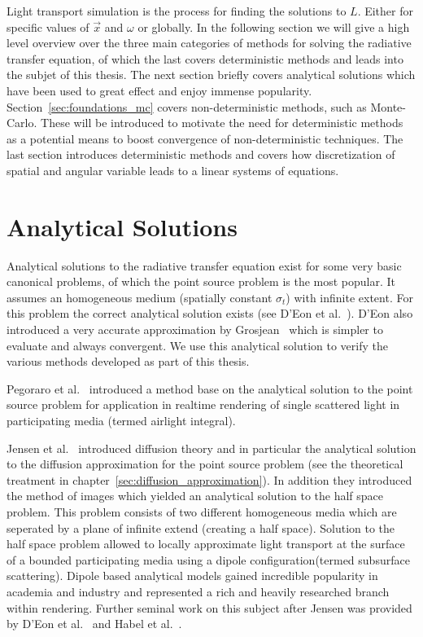 Light transport simulation is the process for finding the solutions to $L$. Either for specific values of $\vec{x}$ and $\omega$ or globally. In the following section we will give a high level overview over the three main categories of methods for solving the radiative transfer equation, of which the last covers deterministic methods and leads into the subjet of this thesis. The next section briefly covers analytical solutions which have been used to great effect and enjoy immense popularity. Section~\ref{sec:foundations_mc} covers non-deterministic methods, such as Monte-Carlo. These will be introduced to motivate the need for deterministic methods as a potential means to boost convergence of non-deterministic techniques. The last section introduces deterministic methods and covers how discretization of spatial and angular variable leads to a linear systems of equations.

\section{Analytical Solutions}
\label{sec:foundations_analytical}

Analytical solutions to the radiative transfer equation exist for some very basic canonical problems, of which the point source problem is the most popular. It assumes an homogeneous medium (spatially constant $\sigma_t$) with infinite extent. For this problem the correct analytical solution exists (see D'Eon et al.~\cite{dEon11}). D'Eon also introduced a very accurate approximation by Grosjean~\cite{Grosjean56} which is simpler to evaluate and always convergent. We use this analytical solution to verify the various methods developed as part of this thesis.

Pegoraro et al.~\cite{Pegoraro11} introduced a method base on the analytical solution to the point source problem for application in realtime rendering of single scattered light in participating media (termed airlight integral).

Jensen et al.~\cite{Jensen01} introduced diffusion theory and in particular the analytical solution to the diffusion approximation for the point source problem (see the theoretical treatment in chapter~\ref{sec:diffusion_approximation}). In addition they introduced the method of images which yielded an analytical solution to the half space problem. This problem consists of two different homogeneous media which are seperated by a plane of infinite extend (creating a half space). Solution to the half space problem allowed to locally approximate light transport at the surface of a bounded participating media using a dipole configuration(termed subsurface scattering). Dipole based analytical models gained incredible popularity in academia and industry and represented a rich and heavily researched branch within rendering. Further seminal work on this subject after Jensen was provided by D'Eon et al.~\cite{dEon11} and Habel et al.~\cite{Habel13}.

